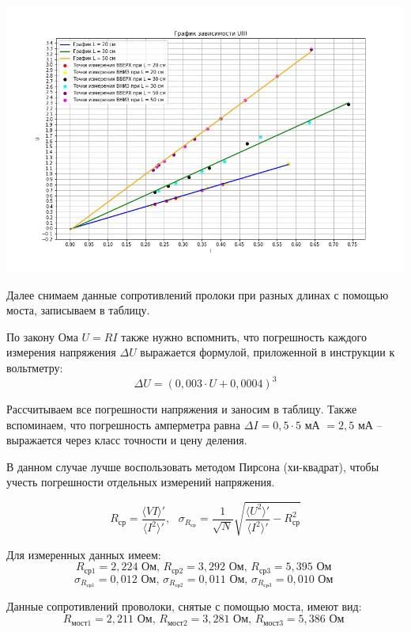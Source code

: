 \documentclass[a4paper, 12pt]{article} %
\begin{document}
\begin{center}
    {\includegraphics[width=14cm]{schedule}}
\end{center}

Далее снимаем данные сопротивлений пролоки при разных длинах с помощью моста, записываем в таблицу.

По закону Ома $U=RI$ также нужно вспомнить, что погрешность каждого измерения напряжения $\Delta U$ выражается формулой, приложенной в инструкции к вольтметру:
\[\Delta U = (0,003\cdot U + 0,0004)^{3}\]

Рассчитываем все погрешности напряжения и заносим в таблицу. Также вспоминаем, что погрешность амперметра равна $\Delta I = 0,5 \cdot 5$ мА $= 2,5$ мА -- выражается через класс точности и цену деления.

В данном случае лучше воспользовать методом Пирсона (хи-квадрат), чтобы учесть погрешности отдельных измерений напряжения. 

\[R_{\text{ср}} = \frac{\langle VI \rangle '}{\langle I^2 \rangle '}, \text{ } \sigma_{R_{\text{ср}}} = \frac{1}{\sqrt{N}} \sqrt{\frac{\langle U^2 \rangle '}{\langle I^2 \rangle '} - R^2_{\text{ср}}}\]

Для измеренных данных имеем:
\[R_{\text{ср}1} = 2,224 \text{ Ом, }R_{\text{ср}2} = 3,292\text{ Ом, }R_{\text{ср}3} = 5,395\text{ Ом }\]
\[\sigma_{R_{\text{ср}1}} = 0,012 \text{ Ом, }\sigma_{R_{\text{ср}2}} = 0,011\text{ Ом, }\sigma_{R_{\text{ср}3}} = 0,010\text{ Ом }\]

Данные сопротивлений проволоки, снятые с помощью моста, имеют вид:
\[R_{\text{мост}1} = 2,211 \text{ Ом, }R_{\text{мост}2} = 3,281\text{ Ом, }R_{\text{мост}3} = 5,386\text{ Ом }\]
\end{document}
